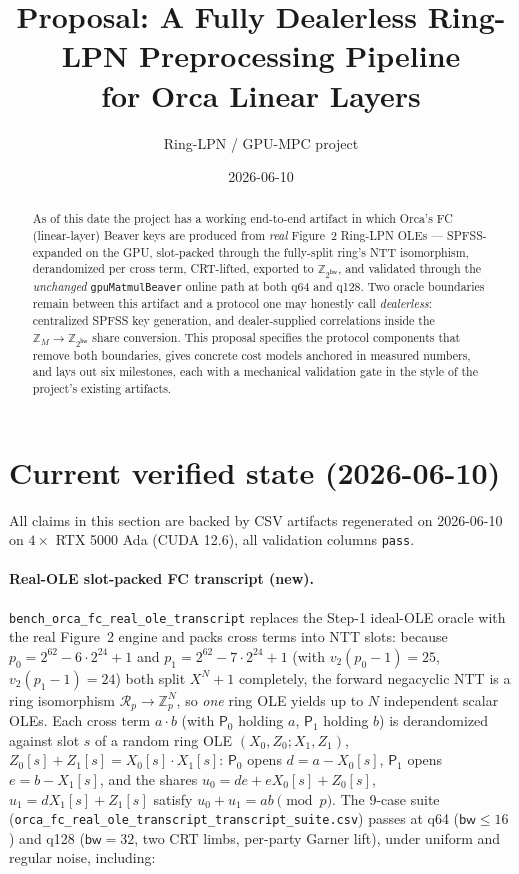 \documentclass[11pt]{article}
\title{Proposal: A Fully Dealerless Ring-LPN Preprocessing Pipeline\\
for Orca Linear Layers}
\author{Ring-LPN / GPU-MPC project}
\date{2026-06-10}
\newcommand{\Z}{\mathbb{Z}}
\newcommand{\R}{\mathcal{R}}
\newcommand{\ServerZero}{\mathsf{P}_0}
\newcommand{\ServerOne}{\mathsf{P}_1}
\newcommand{\modtwo}{\Z_{2^{\mathsf{bw}}}}
\newcommand{\bw}{\mathsf{bw}}
\begin{document}
\maketitle

\begin{abstract}
As of this date the project has a working end-to-end artifact in which Orca's
FC (linear-layer) Beaver keys are produced from \emph{real} Figure~2 Ring-LPN
OLEs --- SPFSS-expanded on the GPU, slot-packed through the fully-split ring's
NTT isomorphism, derandomized per cross term, CRT-lifted, exported to
$\modtwo$, and validated through the \emph{unchanged} \texttt{gpuMatmulBeaver}
online path at both q64 and q128. Two oracle boundaries remain between this
artifact and a protocol one may honestly call \emph{dealerless}: centralized
SPFSS key generation, and dealer-supplied correlations inside the
$\Z_M \to \modtwo$ share conversion. This proposal specifies the protocol
components that remove both boundaries, gives concrete cost models anchored in
measured numbers, and lays out six milestones, each with a mechanical
validation gate in the style of the project's existing artifacts.
\end{abstract}

\section{Current verified state (2026-06-10)}
\label{sec:state}

All claims in this section are backed by CSV artifacts regenerated on
2026-06-10 on $4\times$ RTX 5000 Ada (CUDA 12.6), all validation columns
\texttt{pass}.

\paragraph{Real-OLE slot-packed FC transcript (new).}
\texttt{bench\_orca\_fc\_real\_ole\_transcript} replaces the Step-1 ideal-OLE
oracle with the real Figure~2 engine and packs cross terms into NTT slots:
because $p_0 = 2^{62}-6\cdot2^{24}+1$ and $p_1 = 2^{62}-7\cdot2^{24}+1$
(with $v_2(p_0-1)=25$, $v_2(p_1-1)=24$) both split $X^N+1$
completely, the forward negacyclic NTT is a ring isomorphism
$\R_p \to \Z_p^N$, so \emph{one} ring OLE yields up to $N$ independent scalar
OLEs. Each cross term $a\cdot b$ (with $\ServerZero$ holding $a$, $\ServerOne$
holding $b$) is derandomized against slot $s$ of a random ring OLE
$(X_0, Z_0; X_1, Z_1)$, $Z_0[s]+Z_1[s]=X_0[s]\cdot X_1[s]$:
$\ServerZero$ opens $d = a - X_0[s]$, $\ServerOne$ opens $e = b - X_1[s]$, and
the shares $u_0 = de + eX_0[s] + Z_0[s]$, $u_1 = dX_1[s] + Z_1[s]$ satisfy
$u_0+u_1 = ab \pmod p$. The 9-case suite
(\texttt{orca\_fc\_real\_ole\_transcript\_transcript\_suite.csv}) passes at
q64 ($\bw \le 16$) and q128 ($\bw = 32$, two CRT limbs, per-party Garner
lift), under uniform and regular noise, including:
\end{document}
